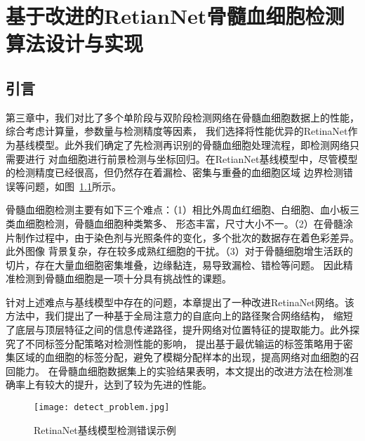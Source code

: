 \chapter{基于改进的RetianNet骨髓血细胞检测算法设计与实现}
\section{引言}

第三章中，我们对比了多个单阶段与双阶段检测网络在骨髓血细胞数据上的性能，综合考虑计算量，参数量与检测精度等因素，
我们选择将性能优异的RetinaNet作为基线模型。此外我们确定了先检测再识别的骨髓血细胞处理流程，即检测网络只需要进行
对血细胞进行前景检测与坐标回归。在RetianNet基线模型中，尽管模型的检测精度已经很高，但仍然存在着漏检、密集与重叠的血细胞区域
边界检测错误等问题，如图~\ref{fig:detect_problem}所示。

骨髓血细胞检测主要有如下三个难点：（1）相比外周血红细胞、白细胞、血小板三类血细胞检测，骨髓血细胞种类繁多、
形态丰富，尺寸大小不一。（2）在骨髓涂片制作过程中，由于染色剂与光照条件的变化，多个批次的数据存在着色彩差异。此外图像
背景复杂，存在较多成熟红细胞的干扰。（3）对于骨髓细胞增生活跃的切片，存在大量血细胞密集堆叠，边缘黏连，易导致漏检、错检等问题。
因此精准检测到骨髓血细胞是一项十分具有挑战性的课题。

针对上述难点与基线模型中存在的问题，本章提出了一种改进RetinaNet网络。该方法中，我们提出了一种基于全局注意力的自底向上的路径聚合网络结构，
缩短了底层与顶层特征之间的信息传递路径，提升网络对位置特征的提取能力。此外探究了不同标签分配策略对检测性能的影响，
提出基于最优输运的标签策略用于密集区域的血细胞的标签分配，避免了模糊分配样本的出现，提高网络对血细胞的召回能力。
在骨髓血细胞数据集上的实验结果表明，本文提出的改进方法在检测准确率上有较大的提升，达到了较为先进的性能。

\begin{figure}[htbp]                     
  \centering                      
  \texttt{[image: detect\_problem.jpg]}                      
  \caption{RetinaNet基线模型检测错误示例}                      
  \label{fig:detect_problem}       
\end{figure}  

